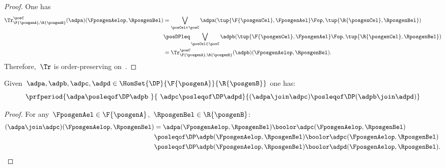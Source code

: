 \begin{proof}
    One has
    \begin{equation}
        \label{eq:trace_pres_ord}
        \begin{aligned}
            \Tr_{\F{\posgenA},\R{\posgenB}}^\posC(\adpa)(\FposgenAelop,\RposgenBel) & =
            \bigvee_{\posCel\in \posC}\adpa(\tup{\F{\posgenCel},\FposgenAel}\Fop,\tup{\R{\posgenCel},\RposgenBel})                                                                                     \\
                                                                                    & \posDPleq \bigvee_{\posCel\in \posC}\adpb(\tup{\F{\posgenCel},\FposgenAel}\Fop,\tup{\R{\posgenCel},\RposgenBel}) \\
                                                                                    & =\Tr_{\F{\posgenA},\R{\posgenB}}^\posC(\adpb)(\FposgenAelop,\RposgenBel).
        \end{aligned}
    \end{equation}
    Therefore,~$\Tr$ is order-preserving on~\DP.
\end{proof}

\begin{lemma}
    \label{lem:coprod_mon}
    Given~$\adpa,\adpb,\adpc,\adpd \in \HomSet{\DP}{\F{\posgenA}}{\R{\posgenB}}$ one has:
    \begin{equation*}
        \prfperiod{\adpa\posleqof\DP \adpb\ }{\ \adpc\posleqof\DP\adpd}{(\adpa\join\adpc)\posleqof\DP (\adpb\join \adpd)}
    \end{equation*}
\end{lemma}
\begin{proof}
    For any~$\FposgenAel\in \F{\posgenA}$,~$\RposgenBel\in \R{\posgenB}$:
    \begin{equation*}
        \begin{aligned}
            (\adpa \join \adpc)(\FposgenAelop,\RposgenBel)
             & =\adpa(\FposgenAelop,\RposgenBel)\boolor \adpc(\FposgenAelop,\RposgenBel)              \\
             & \posleqof\DP \adpb(\FposgenAelop,\RposgenBel)\boolor \adpc(\FposgenAelop,\RposgenBel)  \\
             & \posleqof\DP \adpb(\FposgenAelop,\RposgenBel)\boolor \adpd(\FposgenAelop,\RposgenBel).
        \end{aligned}
    \end{equation*}
\end{proof}

